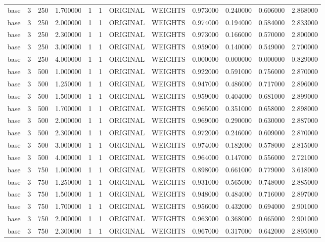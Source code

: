 \begin{tabular}{lrrrllllrrrr}
base & 3 & 250 & 1.700000 & 1 & 1 & ORIGINAL & WEIGHTS & 0.973000 & 0.240000 & 0.606000 & 2.868000 \\
base & 3 & 250 & 2.000000 & 1 & 1 & ORIGINAL & WEIGHTS & 0.974000 & 0.194000 & 0.584000 & 2.833000 \\
base & 3 & 250 & 2.300000 & 1 & 1 & ORIGINAL & WEIGHTS & 0.973000 & 0.166000 & 0.570000 & 2.800000 \\
base & 3 & 250 & 3.000000 & 1 & 1 & ORIGINAL & WEIGHTS & 0.959000 & 0.140000 & 0.549000 & 2.700000 \\
base & 3 & 250 & 4.000000 & 1 & 1 & ORIGINAL & WEIGHTS & 0.000000 & 0.000000 & 0.000000 & 0.829000 \\
base & 3 & 500 & 1.000000 & 1 & 1 & ORIGINAL & WEIGHTS & 0.922000 & 0.591000 & 0.756000 & 2.870000 \\
base & 3 & 500 & 1.250000 & 1 & 1 & ORIGINAL & WEIGHTS & 0.947000 & 0.486000 & 0.717000 & 2.896000 \\
base & 3 & 500 & 1.500000 & 1 & 1 & ORIGINAL & WEIGHTS & 0.959000 & 0.404000 & 0.681000 & 2.899000 \\
base & 3 & 500 & 1.700000 & 1 & 1 & ORIGINAL & WEIGHTS & 0.965000 & 0.351000 & 0.658000 & 2.898000 \\
base & 3 & 500 & 2.000000 & 1 & 1 & ORIGINAL & WEIGHTS & 0.969000 & 0.290000 & 0.630000 & 2.887000 \\
base & 3 & 500 & 2.300000 & 1 & 1 & ORIGINAL & WEIGHTS & 0.972000 & 0.246000 & 0.609000 & 2.870000 \\
base & 3 & 500 & 3.000000 & 1 & 1 & ORIGINAL & WEIGHTS & 0.974000 & 0.182000 & 0.578000 & 2.815000 \\
base & 3 & 500 & 4.000000 & 1 & 1 & ORIGINAL & WEIGHTS & 0.964000 & 0.147000 & 0.556000 & 2.721000 \\
base & 3 & 750 & 1.000000 & 1 & 1 & ORIGINAL & WEIGHTS & 0.898000 & 0.661000 & 0.779000 & 3.618000 \\
base & 3 & 750 & 1.250000 & 1 & 1 & ORIGINAL & WEIGHTS & 0.931000 & 0.565000 & 0.748000 & 2.885000 \\
base & 3 & 750 & 1.500000 & 1 & 1 & ORIGINAL & WEIGHTS & 0.948000 & 0.484000 & 0.716000 & 2.897000 \\
base & 3 & 750 & 1.700000 & 1 & 1 & ORIGINAL & WEIGHTS & 0.956000 & 0.432000 & 0.694000 & 2.901000 \\
base & 3 & 750 & 2.000000 & 1 & 1 & ORIGINAL & WEIGHTS & 0.963000 & 0.368000 & 0.665000 & 2.901000 \\
base & 3 & 750 & 2.300000 & 1 & 1 & ORIGINAL & WEIGHTS & 0.967000 & 0.317000 & 0.642000 & 2.895000 \\

\end{tabular}
